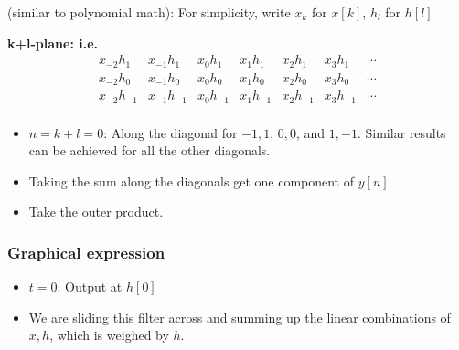 \begin{intuition}
    (similar to polynomial math): For simplicity, write $x_k$ for $x[k]$, $h_l$ for $h[l]$

    \textbf{k+l-plane: i.e.}
    \[
    \begin{array}{ccccccc}
    x_{-2} h_1 & x_{-1} h_1 & x_0 h_1 & x_1 h_1 & x_2 h_1 & x_3 h_1 & \cdots \\
    x_{-2} h_0 & x_{-1} h_0 & x_0 h_0 & x_1 h_0 & x_2 h_0 & x_3 h_0 & \cdots \\
    x_{-2} h_{-1} & x_{-1} h_{-1} & x_0 h_{-1} & x_1 h_{-1} & x_2 h_{-1} & x_3 h_{-1} & \cdots \\
    \end{array}
    \]
    \begin{itemize}
        \item $n=k+l=0$: Along the diagonal for $-1,1$, $0,0$, and $1,-1$. Similar results can be achieved for all the other diagonals. 
        \item Taking the sum along the diagonals get one component of $y[n]$
        \item Take the outer product.
    \end{itemize}
\end{intuition}

\subsubsection{Graphical expression}
\begin{definition}
    \begin{itemize}
        \item $t=0$: Output at $h[0]$
        \item We are sliding this filter across and summing up the linear combinations of $x,h$, which is weighed by $h$.
    \end{itemize}
\end{definition}

